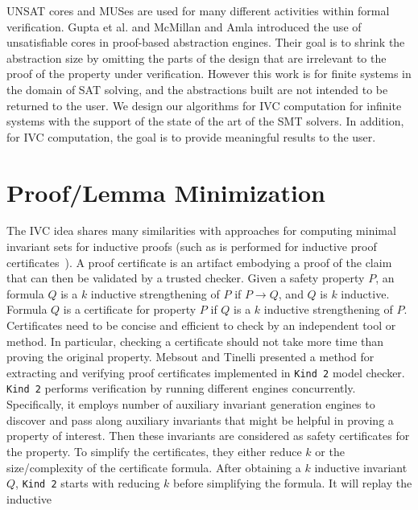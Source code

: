 UNSAT cores and MUSes are used for many different activities within
formal verification. Gupta et al. \cite{gupta2003iterative} and
McMillan and Amla \cite{mcmillan2003automatic} introduced the use of
unsatisfiable cores in proof-based abstraction engines. Their goal is
to shrink the abstraction size by omitting the parts of the design
that are irrelevant to the proof of the property under verification.
However this work is for finite systems in the domain of SAT solving,
 and the abstractions built are not intended to be returned to the user.
 We design our algorithms for IVC computation for
 infinite systems with the support of the state of the art of the SMT solvers. In addition, for IVC computation, the goal is to provide meaningful results to the user.

\section{Proof/Lemma Minimization}
\label{sec:proofcert}
The IVC idea shares many similarities with approaches for computing minimal invariant sets for inductive proofs (such as is performed for inductive proof certificates~\cite{piskac2016, Ivrii14:invariants}).
A proof certificate is an artifact embodying a proof of the
claim that can then be validated by a trusted checker.
Given a safety property $P$, an formula $Q$ is a $k$ inductive strengthening of $P$ if
$P \rightarrow Q$, and $Q$ is $k$ inductive.
Formula $Q$ is a certificate for property $P$ if $Q$ is
a $k$ inductive strengthening of $P$.
Certificates need to be concise and efficient to check
by an independent tool or method. In particular,
checking a certificate should not take more
time than proving the original property. Mebsout and Tinelli presented a method for extracting and verifying proof certificates \cite{piskac2016} implemented in \texttt{Kind 2} model checker.
\texttt{Kind 2} performs verification by running different engines concurrently. Specifically, it employs number of auxiliary invariant generation engines to
discover and pass along auxiliary invariants that might be
helpful in proving a property of interest. Then these invariants are considered as
safety certificates for the property.
To simplify the certificates, they either reduce $k$ or the size/complexity of the certificate formula.
After obtaining a $k$ inductive invariant $Q$, \texttt{Kind 2} starts with reducing $k$ before simplifying the formula. It will replay the inductive
